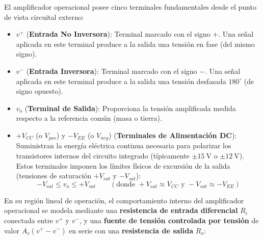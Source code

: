 El amplificador operacional posee cinco terminales fundamentales desde el punto de vista circuital externo:
\begin{itemize}[leftmargin=*]
    \item $v^+$ (\textbf{Entrada No Inversora}): Terminal marcado con el signo $+$. Una señal aplicada en este terminal produce a la salida una tensión en fase (del mismo signo).
    \item $v^-$ (\textbf{Entrada Inversora}): Terminal marcado con el signo $-$. Una señal aplicada en este terminal produce a la salida una tensión desfasada $180^\circ$ (de signo opuesto).
    \item $v_o$ (\textbf{Terminal de Salida}): Proporciona la tensión amplificada medida respecto a la referencia común (masa o tierra).
    \item $+V_{CC}$ (o $V_{pos}$) y $-V_{EE}$ (o $V_{neg}$) (\textbf{Terminales de Alimentación DC}): Suministran la energía eléctrica continua necesaria para polarizar los transistores internos del circuito integrado (típicamente $\pm 15\ \si{\volt}$ o $\pm 12\ \si{\volt}$). Estos terminales imponen los límites físicos de excursión de la salida (tensiones de saturación $+V_{sat}$ y $-V_{sat}$):
    \begin{equation}
        -V_{sat} \le v_o \le +V_{sat} \qquad (\text{donde } +V_{sat} \approx V_{CC} \text{ y } -V_{sat} \approx -V_{EE})
    \end{equation}
\end{itemize}

En su región lineal de operación, el comportamiento interno del amplificador operacional se modela mediante una \textbf{resistencia de entrada diferencial} $R_i$ conectada entre $v^+$ y $v^-$, y una \textbf{fuente de tensión controlada por tensión} de valor $A_v(v^+ - v^-)$ en serie con una \textbf{resistencia de salida} $R_o$:

